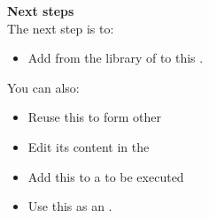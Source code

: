 \textbf{Next steps}\\
The next step is to:
\begin{itemize}
\item Add \gdcases{} from the library of \gdcases{} to this \gdcase{}. 

\end{itemize}

You can also:
\begin{itemize} 
\item Reuse this \gdcase{} to form other \gdcases{}  
\item Edit its content in the \gdtestcaseeditor{} 
\item Add this \gdcase{} to a \gdsuite{} to be executed 
\item Use this \gdcase{} as an \gdehandler {}. 
\end{itemize}













